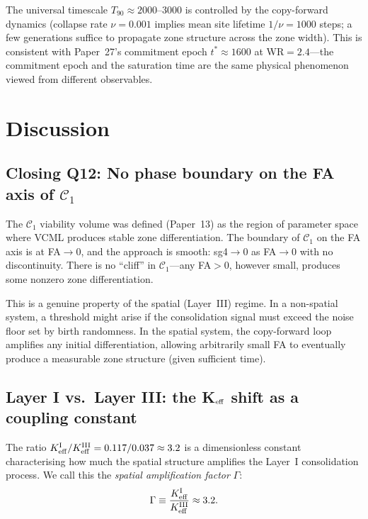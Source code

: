 \documentclass[11pt,a4paper]{article}
\begin{document}
The universal timescale $T_{90}\approx2000$--$3000$ is controlled by the
copy-forward dynamics (collapse rate $\nu=0.001$ implies mean site
lifetime $1/\nu=1000$ steps; a few generations suffice to propagate
zone structure across the zone width).
This is consistent with Paper~27's commitment epoch $t^*\approx1600$
at WR$=2.4$---the commitment epoch and the saturation time are the same
physical phenomenon viewed from different observables.

\section{Discussion}

\subsection{Closing Q12: No phase boundary on the FA axis of $\mathcal{C}_1$}

The $\mathcal{C}_1$ viability volume was defined (Paper~13) as the region of
parameter space where VCML produces stable zone differentiation.
The boundary of $\mathcal{C}_1$ on the FA axis is at FA$\to0$, and the
approach is smooth: sg4$\to0$ as FA$\to0$ with no discontinuity.
There is no ``cliff'' in $\mathcal{C}_1$---any FA$>0$, however small, produces
some nonzero zone differentiation.

This is a genuine property of the spatial (Layer~III) regime.
In a non-spatial system, a threshold might arise if the consolidation signal
must exceed the noise floor set by birth randomness.
In the spatial system, the copy-forward loop amplifies any initial
differentiation, allowing arbitrarily small FA to eventually produce
a measurable zone structure (given sufficient time).

\subsection{Layer I vs.\ Layer III: the K$_{\rm eff}$ shift as a coupling constant}

The ratio $K_{\rm eff}^{\rm I} / K_{\rm eff}^{\rm III} = 0.117/0.037 \approx 3.2$
is a dimensionless constant characterising how much the spatial structure
amplifies the Layer~I consolidation process.
We call this the \emph{spatial amplification factor} $\Gamma$:
\begin{equation}
  \Gamma \equiv \frac{K_{\rm eff}^{\rm I}}{K_{\rm eff}^{\rm III}} \approx 3.2.
  \label{eq:gamma}
\end{equation}
\end{document}
